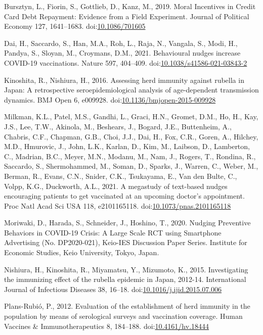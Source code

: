 \documentclass[
  11pt,
  a4paper,
]{article}
\newlength{\cslhangindent}
\newlength{\cslentryspacingunit} %
\newenvironment{CSLReferences}[2] %
 {%
  \setlength{\parindent}{0pt}
  \ifodd #1
  \let\oldpar\par
  \def\par{\hangindent=\cslhangindent\oldpar}
  \fi
  \setlength{\parskip}{#2\cslentryspacingunit}
 }%
 {}
\begin{document}
\hypertarget{refs}{}
\begin{CSLReferences}{1}{0}
\leavevmode{}%
Bursztyn, L., Fiorin, S., Gottlieb, D., Kanz, M., 2019. Moral {Incentives} in {Credit Card Debt Repayment}: {Evidence} from a {Field Experiment}. Journal of Political Economy 127, 1641--1683. doi:\href{https://doi.org/10.1086/701605}{10.1086/701605}

\leavevmode{}%
Dai, H., Saccardo, S., Han, M.A., Roh, L., Raja, N., Vangala, S., Modi, H., Pandya, S., Sloyan, M., Croymans, D.M., 2021. Behavioural nudges increase {COVID-19} vaccinations. Nature 597, 404--409. doi:\href{https://doi.org/10.1038/s41586-021-03843-2}{10.1038/s41586-021-03843-2}

\leavevmode{}%
Kinoshita, R., Nishiura, H., 2016. Assessing herd immunity against rubella in {Japan}: A retrospective seroepidemiological analysis of age-dependent transmission dynamics. BMJ Open 6, e009928. doi:\href{https://doi.org/10.1136/bmjopen-2015-009928}{10.1136/bmjopen-2015-009928}

\leavevmode{}%
Milkman, K.L., Patel, M.S., Gandhi, L., Graci, H.N., Gromet, D.M., Ho, H., Kay, J.S., Lee, T.W., Akinola, M., Beshears, J., Bogard, J.E., Buttenheim, A., Chabris, C.F., Chapman, G.B., Choi, J.J., Dai, H., Fox, C.R., Goren, A., Hilchey, M.D., Hmurovic, J., John, L.K., Karlan, D., Kim, M., Laibson, D., Lamberton, C., Madrian, B.C., Meyer, M.N., Modanu, M., Nam, J., Rogers, T., Rondina, R., Saccardo, S., Shermohammed, M., Soman, D., Sparks, J., Warren, C., Weber, M., Berman, R., Evans, C.N., Snider, C.K., Tsukayama, E., Van den Bulte, C., Volpp, K.G., Duckworth, A.L., 2021. A megastudy of text-based nudges encouraging patients to get vaccinated at an upcoming doctor's appointment. Proc Natl Acad Sci USA 118, e2101165118. doi:\href{https://doi.org/10.1073/pnas.2101165118}{10.1073/pnas.2101165118}

\leavevmode{}%
Moriwaki, D., Harada, S., Schneider, J., Hoshino, T., 2020. Nudging Preventive Behaviors in COVID-19 Crisis: A Large Scale RCT using Smartphone Advertising (No. DP2020-021), Keio-IES Discussion Paper Series. {Institute for Economic Studies, Keio University}, {Tokyo, Japan}.

\leavevmode{}%
Nishiura, H., Kinoshita, R., Miyamatsu, Y., Mizumoto, K., 2015. Investigating the immunizing effect of the rubella epidemic in {Japan}, 2012-14. International Journal of Infectious Diseases 38, 16--18. doi:\href{https://doi.org/10.1016/j.ijid.2015.07.006}{10.1016/j.ijid.2015.07.006}

\leavevmode{}%
Plans-Rubió, P., 2012. Evaluation of the establishment of herd immunity in the population by means of serological surveys and vaccination coverage. Human Vaccines \& Immunotherapeutics 8, 184--188. doi:\href{https://doi.org/10.4161/hv.18444}{10.4161/hv.18444}

\end{CSLReferences}
\end{document}
